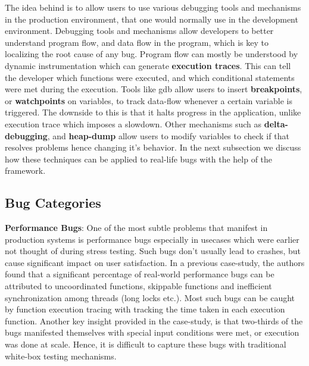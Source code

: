 The idea behind \parikshan is to allow users to use various debugging tools and mechanisms in the production environment, that one would normally use in the development environment.
Debugging tools and mechanisms allow developers to better understand program flow, and data flow in the program, which is key to localizing the root cause of any bug.
Program flow can mostly be understood by dynamic instrumentation which can generate \textbf{execution traces}. 
This can tell the developer which functions were executed, and which conditional statements were met during the execution.
Tools like gdb allow users to insert \textbf{breakpoints}, or \textbf{watchpoints} on variables, to track data-flow whenever a certain variable is triggered.
The downside to this is that it halts progress in the application, unlike execution trace which imposes a slowdown. 
Other mechanisms such as \textbf{delta-debugging}, and \textbf{heap-dump} allow users to modify variables to check if that resolves problems hence changing it's behavior.
In the next subsection we discuss how these techniques can be applied to real-life bugs with the help of the \parikshan framework.

\subsection{Bug Categories}
\label{sec:bugCategories}

\noindent
\textbf{Performance Bugs}: One of the most subtle problems that manifest in production systems is performance bugs especially in usecases which were earlier not thought of during stress testing.
Such bugs don't usually lead to crashes, but cause significant impact on user satisfaction.
In a previous case-study\cite{shanluPerf}, the authors found that a significant percentage of real-world performance bugs can be attributed to uncoordinated functions, skippable functions and inefficient synchronization among threads (long locks etc.).
Most such bugs can be caught by function execution tracing with tracking the time taken in each execution function.
Another key insight provided in the case-study, is that two-thirds of the bugs manifested themselves with special input conditions were met, or execution was done at scale. Hence, it is difficult to capture these bugs with traditional white-box testing mechanisms.

